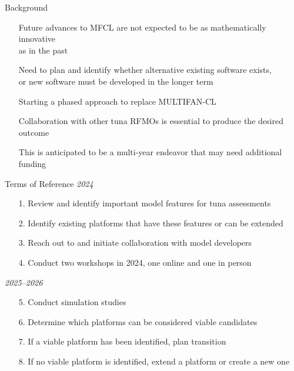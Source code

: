 \documentclass[aspectratio=169]{beamer}
\begin{document}
\begin{frame}{Background}\small
  \begin{itemize}
    \item[] Future advances to MFCL are not expected to be as mathematically
    innovative\\
    as in the past\\[4ex]

    \item[] Need to plan and identify whether alternative existing software
    exists,\\
    or new software must be developed in the longer term\\[4ex]

    \item[] Starting a phased approach to replace MULTIFAN-CL\\[4ex]

    \item[] Collaboration with other tuna RFMOs is essential to produce the
    desired outcome\\[4ex]

    \item[] This is anticipated to be a multi-year endeavor that may need
    additional funding\\[3ex]
  \end{itemize}
\end{frame}


\begin{frame}{Terms of Reference}\small
  \textit{2024}
  \begin{itemize}
    \item[1.] Review and identify important model features for tuna
    assessments\\[-1ex]
    \item[2.] Identify existing platforms that have these features or can be
    extended\\[-1ex]
    \item[3.] Reach out to and initiate collaboration with model
    developers\\[-1ex]
    \item[4.] Conduct two workshops in 2024, one online and one in person\\[4ex]
  \end{itemize}
  \textit{2025--2026}
  \begin{itemize}
    \item[5.] Conduct simulation studies\\[-1ex]
    \item[6.] Determine which platforms can be considered viable
    candidates\\[-1ex]
    \item[7.] If a viable platform has been identified, plan transition\\[-1ex]
    \item[8.] If no viable platform is identified, extend a platform or create a
    new one
  \end{itemize}
\end{frame}
\end{document}
